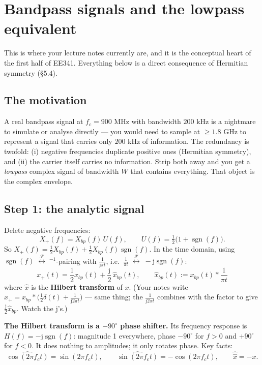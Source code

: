 \documentclass[11pt,a4paper]{article}
\newcommand{\FT}{\;\stackrel{\mathcal{F}}{\longleftrightarrow}\;}
\newcommand{\sgn}{\operatorname{sgn}}
\newcommand{\ii}{\mathrm{j}}
\begin{document}
\section{Bandpass signals and the lowpass equivalent}

This is where your lecture notes currently are, and it is the conceptual heart of the first half of EE341.
Everything below is a direct consequence of Hermitian symmetry (\S5.4).

\subsection{The motivation}
A real bandpass signal at $f_c=900$ MHz with bandwidth $200$ kHz is a nightmare to simulate or analyse
directly --- you would need to sample at $\ge1.8$ GHz to represent a signal that carries only $200$ kHz of
information. The redundancy is twofold: (i) negative frequencies duplicate positive ones (Hermitian symmetry),
and (ii) the carrier itself carries no information. Strip both away and you get a \emph{lowpass} complex
signal of bandwidth $W$ that contains everything. That object is the complex envelope.

\subsection{Step 1: the analytic signal}
Delete negative frequencies:
\[
X_+(f)=X_{bp}(f)\,U(f),\qquad U(f)=\tfrac12\big(1+\sgn(f)\big).
\]
So $X_+(f)=\tfrac12 X_{bp}(f)+\tfrac12X_{bp}(f)\sgn(f)$. In the time domain, using
$\sgn(f)\FT^{-1}$-pairing with $\frac{1}{\ii\pi t}$, i.e.\ $\frac{1}{\pi t}\FT-\ii\sgn(f)$:
\[
x_+(t)=\frac12 x_{bp}(t)+\frac{\ii}{2}\,\hat x_{bp}(t),
\qquad
\hat x_{bp}(t):=x_{bp}(t)*\frac{1}{\pi t}
\]
where $\hat x$ is the \textbf{Hilbert transform} of $x$. (Your notes write
$x_+ = x_{bp}*\big(\tfrac12\delta(t)+\tfrac{1}{\ii2\pi t}\big)$ --- same thing; the
$\tfrac{1}{\ii 2\pi t}$ combines with the factor to give $\tfrac{\ii}{2}\hat x_{bp}$. Watch the $\ii$'s.)

\begin{keybox}
\textbf{The Hilbert transform is a $-90^\circ$ phase shifter.} Its frequency response is
$H(f)=-\ii\sgn(f)$: magnitude 1 everywhere, phase $-90^\circ$ for $f>0$ and $+90^\circ$ for $f<0$.
It does nothing to amplitudes; it only rotates phase. Key facts:
\[
\widehat{\cos(2\pi f_ct)}=\sin(2\pi f_ct),\qquad \widehat{\sin(2\pi f_ct)}=-\cos(2\pi f_ct),\qquad \hat{\hat x}=-x.
\]
\end{keybox}
\end{document}
